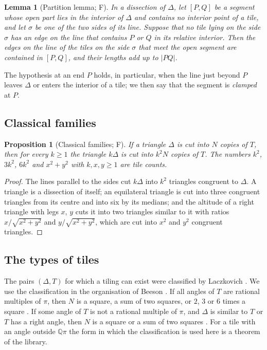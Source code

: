 \documentclass[11pt,reqno]{amsart}
\theoremstyle{plain}
\newtheorem{lemma}[theorem]{Lemma}
\newtheorem{proposition}[theorem]{Proposition}
\theoremstyle{definition}
\newcommand{\Q}{\mathbb{Q}}
\newcommand{\sF}{\textup{\textsf{F}}}
\begin{document}
\begin{lemma}[Partition lemma; \sF]\label{lem:partition}
In a dissection of $\Delta$, let $[P,Q]$ be a segment whose open part lies in the interior of $\Delta$ and
contains no interior point of a tile, and let $\sigma$ be one of the two sides of its line. Suppose that no
tile lying on the side $\sigma$ has an edge on the line that contains $P$ or $Q$ in its relative interior.
Then the edges on the line of the tiles on the side $\sigma$ that meet the open segment are contained in
$[P,Q]$, and their lengths add up to $|PQ|$.
\end{lemma}

The hypothesis at an end $P$ holds, in particular, when the line just beyond $P$ leaves $\Delta$ or enters
the interior of a tile; we then say that the segment is \emph{clamped} at $P$.

\subsection{Classical families}

\begin{proposition}[Classical families; \sF]\label{prop:families}
If a triangle $\Delta$ is cut into $N$ copies of $T$, then for every $k\ge1$ the triangle $k\Delta$ is cut
into $k^2N$ copies of $T$. The numbers $k^2$, $3k^2$, $6k^2$ and $x^2+y^2$ with $k,x,y\ge1$ are tile counts.
\end{proposition}

\begin{proof}
The lines parallel to the sides cut $k\Delta$ into $k^2$ triangles congruent to $\Delta$. A triangle is a
dissection of itself; an equilateral triangle is cut into three congruent triangles from its centre and
into six by its medians; and the altitude of a right triangle with legs $x$, $y$ cuts it into two triangles
similar to it with ratios $x/\sqrt{x^2+y^2}$ and $y/\sqrt{x^2+y^2}$, which are cut into $x^2$ and $y^2$
congruent triangles.
\end{proof}

\subsection{The types of tiles}\label{sub:types}
The pairs $(\Delta,T)$ for which a tiling can exist were classified by Laczkovich
\cite{Laczkovich1995,Laczkovich2012}. We use the classification in the organisation of Beeson
\cite{BeesonSeven}. If all angles of $T$ are rational multiples of $\pi$, then $N$ is a square, a sum of two
squares, or $2$, $3$ or $6$ times a square \cite[Thm.~3 and Table~3]{BeesonSeven}. If some angle of $T$ is
not a rational multiple of $\pi$, and $\Delta$ is similar to $T$ or $T$ has a right angle, then $N$ is a
square or a sum of two squares \cite{BeesonI,SWW}. For a tile with an angle outside $\Q\pi$ the form in
which the classification is used here is a theorem of the library.
\end{document}
